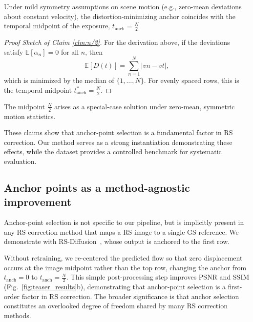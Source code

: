 \begin{claim}[]
\label{clm:n/2}
Under mild symmetry assumptions on scene motion (e.g., zero-mean deviations about constant velocity), the distortion-minimizing anchor coincides with the temporal midpoint of the exposure,  $t_{\text{anch}} = \frac{N}{2}$
\end{claim}

\begin{proof}[Proof Sketch of Claim \ref{clm:n/2}]
For the derivation above, if the deviations satisfy $\mathbb{E}[\alpha_n] = 0$ for all $n$, then
\begin{equation}
   \mathbb{E}[D(t)] = \sum_{n=1}^{N} | v n - v t |,
\end{equation}
which is minimized by the median of $\{1,\dots,N\}$. For evenly spaced rows, this is the temporal midpoint $t_{\text{anch}}^* = \frac{N}{2}$.
\end{proof}
\begin{corollary}
       The midpoint $\frac{N}{2}$ arises as a special-case solution under zero-mean, symmetric motion statistics.
\end{corollary}

These claims show that anchor-point selection is a fundamental factor in RS correction. Our method serves as a strong instantiation demonstrating these effects, while the dataset provides a controlled benchmark for systematic evaluation.


\subsection{Anchor points as a method-agnostic improvement}
Anchor-point selection is not specific to our pipeline, but is implicitly present in any RS correction method that maps a RS image to a single GS reference. We demonstrate with RS-Diffusion~\cite{RS-Diffusion}, whose output is anchored to the first row.

Without retraining, we re-centered the predicted flow so that zero displacement occurs at the image midpoint rather than the top row, changing the anchor from $t_{\text{anch}}=0$ to $t_{\text{anch}}=\frac{N}{2}$. This simple post-processing step improves PSNR and SSIM (Fig.~\ref{fig:teaser_results}b), demonstrating that anchor-point selection is a first-order factor in RS correction. The broader significance is that anchor selection constitutes an overlooked degree of freedom shared by many RS correction methods.


